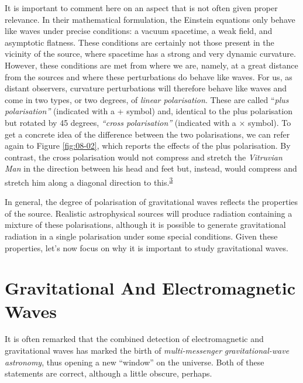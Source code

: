 It is important to comment here on an aspect that is not often given proper relevance.
In their mathematical formulation, the Einstein equations only behave like waves under
precise conditions: a vacuum spacetime, a weak field, and asymptotic
flatness. These conditions are certainly not those present in the
vicinity of the source, where spacetime has a strong and very dynamic curvature.
However, these conditions are met from where we are, namely, at a great distance from
the sources and where these perturbations do behave like waves. For us, as distant
observers, curvature perturbations will therefore behave like waves and come in two
types, or two degrees, of \emph{linear
polarisation}. These are called ``\emph{plus
polarisation''} (indicated with a + symbol) and, identical to the plus polarisation but
rotated by 45 degrees, \emph{``cross polarisation''}  (indicated with
a × symbol). To get a concrete idea of the difference between the two polarisations, we
can refer again to Figure \ref{fig:08-02}, which reports the effects of the plus polarisation. By
contrast, the cross polarisation would not compress and stretch the
\emph{Vitruvian} \emph{Man} in the direction between his head and
feet but, instead, would compress and stretch him along a diagonal direction to
this.\textsuperscript{\hyperlink{note:08-03}{3}}

In general, the degree of polarisation of gravitational waves
reflects the properties of the source. Realistic astrophysical sources will produce
radiation containing a mixture of these polarisations, although it is possible to
generate gravitational radiation in a single polarisation under some
special conditions. Given these properties, let's now focus on why it is important to
study gravitational waves.

\section{Gravitational And Electromagnetic Waves}\label{sec:08-comparison}

It is often remarked that the combined detection of electromagnetic and gravitational
waves has marked the birth of \emph{multi-messenger}
\emph{gravitational-wave astronomy}, thus opening a new ``window'' on the universe. Both
of these statements are correct, although a little obscure, perhaps.

